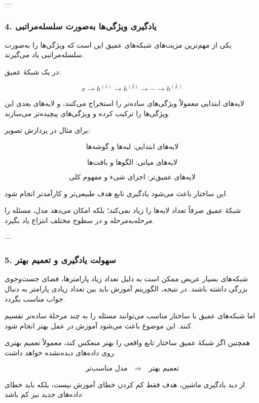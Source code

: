 \documentclass[12pt,a4paper]{article}
\begin{document}
---

\subsubsection{4. یادگیری ویژگی‌ها به‌صورت سلسله‌مراتبی}

یکی از مهم‌ترین مزیت‌های شبکه‌های عمیق این است که ویژگی‌ها را به‌صورت سلسله‌مراتبی یاد می‌گیرند.

در یک شبکهٔ عمیق:

\[
x \rightarrow h^{(1)} \rightarrow h^{(2)} \rightarrow \cdots \rightarrow h^{(L)}
\]

لایه‌های ابتدایی معمولاً ویژگی‌های ساده‌تر را استخراج می‌کنند، و لایه‌های بعدی این ویژگی‌ها را ترکیب کرده و ویژگی‌های پیچیده‌تر می‌سازند.

برای مثال در پردازش تصویر:

\[
\text{لایه‌های ابتدایی: لبه‌ها و گوشه‌ها}
\]

\[
\text{لایه‌های میانی: الگوها و بافت‌ها}
\]

\[
\text{لایه‌های عمیق‌تر: اجزای شیء و مفهوم کلی}
\]

این ساختار باعث می‌شود یادگیری تابع هدف طبیعی‌تر و کارآمدتر انجام شود.

\begin{tcolorbox}[
	colback=softorange,
	colframe=golden,
	title=نکتهٔ مهم,
	coltitle=black
	]
	شبکهٔ عمیق صرفاً تعداد لایه‌ها را زیاد نمی‌کند؛ بلکه امکان می‌دهد مدل، مسئله را مرحله‌به‌مرحله و در سطوح مختلف انتزاع یاد بگیرد.
\end{tcolorbox}

---

\subsubsection{5. سهولت یادگیری و تعمیم بهتر}

شبکه‌های بسیار عریض ممکن است به دلیل تعداد زیاد پارامترها، فضای جست‌وجوی بزرگی داشته باشند. در نتیجه، الگوریتم آموزش باید بین تعداد زیادی پارامتر به دنبال جواب مناسب بگردد.

اما شبکه‌های عمیق با ساختار مناسب می‌توانند مسئله را به چند مرحلهٔ ساده‌تر تقسیم کنند. این موضوع باعث می‌شود آموزش در عمل بهتر انجام شود.

همچنین اگر شبکهٔ عمیق ساختار تابع واقعی را بهتر منعکس کند، معمولاً تعمیم بهتری روی داده‌های دیده‌نشده خواهد داشت.

\[
\text{مدل مناسب‌تر}
\quad\Longrightarrow\quad
\text{تعمیم بهتر}
\]

از دید یادگیری ماشین، هدف فقط کم کردن خطای آموزش نیست، بلکه باید خطای داده‌های جدید نیز کم باشد:
\end{document}
